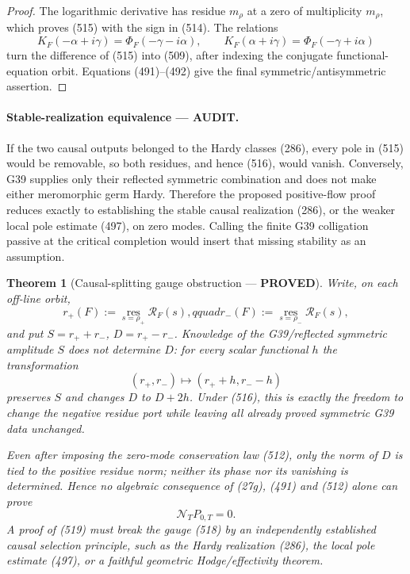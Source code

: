 \documentclass[11pt]{article}
\newtheorem{theorem}{Theorem}
\newcommand{\PROVED}{\textcolor{green!45!black}{\textbf{PROVED}}}
\newcommand{\AUDIT}{\textcolor{orange!75!black}{\textbf{AUDIT}}}
\begin{document}
\begin{proof}
The logarithmic derivative has residue \(m_\rho\) at a zero of
multiplicity \(m_\rho\), which proves (515) with the sign in (514).  The
relations
\[
 K_F(-\alpha+i\gamma)=\Phi_F(-\gamma-i\alpha),\qquad
 K_F( \alpha+i\gamma)=\Phi_F(-\gamma+i\alpha)
\]
turn the difference of (515) into (509), after indexing the conjugate
functional-equation orbit.  Equations (491)--(492) give the final
symmetric/antisymmetric assertion.
\end{proof}

\paragraph{Stable-realization equivalence --- \AUDIT.}
If the two causal outputs belonged to the Hardy classes (286), every pole
in (515) would be removable, so both residues, and hence (516), would vanish.
Conversely, G39 supplies only their reflected symmetric combination and
does not make either meromorphic germ Hardy.  Therefore the proposed
positive-flow proof reduces exactly to establishing the stable causal
realization (286), or the weaker local pole estimate (497), on zero modes.
Calling the finite G39 colligation passive at the critical completion would
insert that missing stability as an assumption.

\begin{theorem}[Causal-splitting gauge obstruction --- \PROVED]
Write, on each off-line orbit,
\begin{equation}
 r_+(F):=\operatorname*{res}_{s=\rho_+}\mathscr R_F(s),qquad
 r_-(F):=\operatorname*{res}_{s=\rho_-}\mathscr R_F(s),       \tag{517}
\end{equation}
and put \(S=r_++r_-\), \(D=r_+-r_-\).  Knowledge of the G39/reflected
symmetric amplitude \(S\) does not determine \(D\): for every scalar
functional \(h\) the transformation
\begin{equation}
 (r_+,r_-)\longmapsto(r_++h,r_--h)                         \tag{518}
\end{equation}
preserves \(S\) and changes \(D\) to \(D+2h\).  Under (516), this is
exactly the freedom to change the negative residue port while leaving all
already proved symmetric G39 data unchanged.

Even after imposing the zero-mode conservation law (512), only the norm of
\(D\) is tied to the positive residue norm; neither its phase nor its
vanishing is determined.  Hence no algebraic consequence of (27g),
(491) and (512) alone can prove
\begin{equation}
 \mathcal N_TP_{0,T}=0.                                  \tag{519}
\end{equation}
A proof of (519) must break the gauge (518) by an independently established
causal selection principle, such as the Hardy realization (286), the local
pole estimate (497), or a faithful geometric Hodge/effectivity theorem.
\end{theorem}
\end{document}
